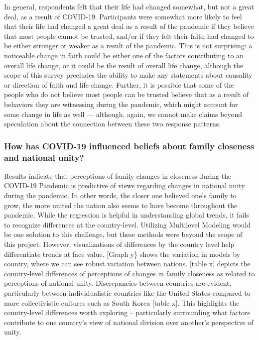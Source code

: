 \documentclass[
  english,
  man]{apa6}
\begin{document}
In general, respondents felt that their life had changed somewhat, but not a great deal, as a result of COVID-19. Participants were somewhat more likely to feel that their life had changed a great deal as a result of the pandemic if they believe that most people cannot be trusted, and/or if they felt their faith had changed to be either stronger or weaker as a result of the pandemic. This is not surprising: a noticeable change in faith could be either one of the factors contributing to an overall life change, or it could be the result of overall life change, although the scope of this survey precludes the ability to make any statements about causality or direction of faith and life change. Further, it is possible that some of the people who do not believe most people can be trusted believe that as a result of behaviors they are witnessing during the pandemic, which might account for some change in life as well --- although, again, we cannot make claims beyond speculation about the connection between these two response patterns.

\hypertarget{how-has-covid-19-influenced-beliefs-about-family-closeness-and-national-unity}{%
\subsubsection{How has COVID-19 influenced beliefs about family closeness and national unity?}\label{how-has-covid-19-influenced-beliefs-about-family-closeness-and-national-unity}}

Results indicate that perceptions of family changes in closeness during the COVID-19 Pandemic is predictive of views regarding changes in national unity during the pandemic. In other words, the closer one believed one's family to grow, the more united the nation also seems to have become throughout the pandemic. While the regression is helpful in understanding global trends, it fails to recognize differences at the country-level. Utilizing Multilevel Modeling would be one solution to this challenge, but these methods were beyond the scope of this project. However, visualizations of differences by the country level help differentiate trends at face value. {[}Graph y\} shows the variation in models by country, where we can see robust variation between nations. {[}table x{]} depicts the country-level differences of perceptions of changes in family closeness as related to perceptions of national unity. Discrepancies between countries are evident, particularly between individualistic countries like the United States compared to more collectivistic cultures such as South Korea {[}table x{]}. This highlights the country-level differences worth exploring -- particularly surrounding what factors contribute to one country's view of national division over another's perspective of unity.
\end{document}
